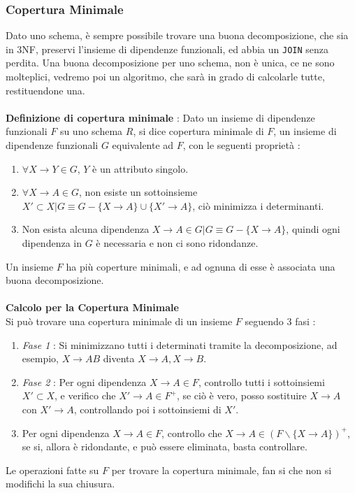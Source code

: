 \documentclass[12pt, letterpaper]{article}
\newcommand{\codee}[1]{\colorbox{white}{\texttt{#1}}}
\newcommand{\acc}{\\\hphantom{}\\}
\begin{document}
\subsubsection{Copertura Minimale}
Dato uno schema, è sempre possibile trovare una buona decomposizione, che sia in 3NF, preservi l'insieme di dipendenze funzionali,
ed abbia un \codee{JOIN} senza perdita. Una buona decomposizione per uno schema, non è unica, ce ne sono molteplici, vedremo poi un 
algoritmo, che sarà in grado di calcolarle tutte, restituendone una.\acc 
\textbf{Definizione di copertura minimale} : Dato un insieme di dipendenze funzionali \(F\) su uno 
schema \(R\), si dice copertura minimale di \(F\), un insieme di dipendenze funzionali \(G\) equivalente ad \(F\), con le 
seguenti proprietà : \begin{enumerate}
    \item \(\forall X\rightarrow Y \in G\), \(Y\) è un attributo singolo.
    \item \(\forall X\rightarrow A \in G\), non esiste un sottoinsieme \(X'\subset X|G\equiv G-\{X\rightarrow A\}\cup \{X'\rightarrow A\}\), 
    ciò minimizza i determinanti.
    \item Non esista alcuna dipendenza \(X\rightarrow A \in G|G\equiv G-\{X\rightarrow A\}\), quindi ogni dipendenza in \(G\) è 
    necessaria e non ci sono ridondanze.
\end{enumerate}
Un insieme \(F\) ha più coperture minimali, e ad ognuna di esse è associata una buona decomposizione.\acc 
\textbf{Calcolo per la Copertura Minimale} \\ 
Si può trovare una copertura minimale di un insieme \(F\) seguendo 3 fasi :\begin{enumerate}
    \item \textit{Fase 1} : Si minimizzano tutti i determinati tramite la decomposizione, ad esempio, \(X\rightarrow AB\) diventa 
    \(X\rightarrow A,X\rightarrow B\).
    \item \textit{Fase 2} : Per ogni dipendenza \(X\rightarrow A\in F\), controllo tutti i sottoinsiemi \(X'\subset X\), e 
    verifico che \(X'\rightarrow A\in F^+\), se ciò è vero, posso sostituire \(X\rightarrow A\) con 
    \(X'\rightarrow A\), controllando poi i sottoinsiemi di \(X'\).
    \item  Per ogni dipendenza \(X\rightarrow A\in F\), controllo che \(X\rightarrow A \in (F\backslash\{X\rightarrow A\})^+\), 
    se si, allora è ridondante, e può essere eliminata, basta controllare.
\end{enumerate}
Le operazioni fatte su \(F\) per trovare la copertura minimale, fan si che non si modifichi la sua chiusura.
\end{document}
